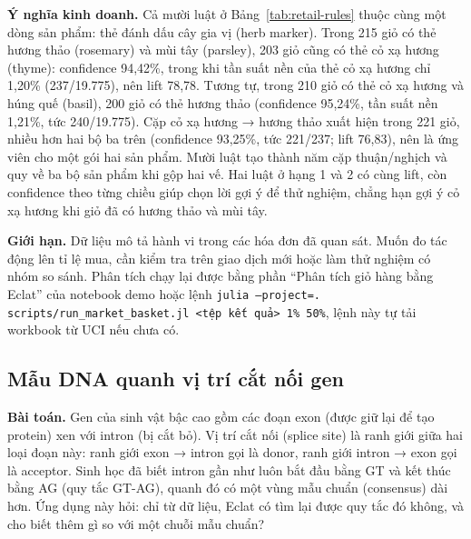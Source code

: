 \textbf{Ý nghĩa kinh doanh.} Cả mười luật ở Bảng~\ref{tab:retail-rules} thuộc cùng một dòng sản phẩm: thẻ đánh dấu
cây gia vị (herb marker). Trong 215 giỏ có thẻ hương thảo (rosemary) và mùi tây (parsley), 203 giỏ cũng có thẻ cỏ
xạ hương (thyme): confidence 94,42\%, trong khi tần suất nền của thẻ cỏ xạ hương chỉ 1,20\% (237/19.775), nên lift
78,78. Tương tự, trong 210 giỏ có thẻ cỏ xạ hương và húng quế (basil), 200 giỏ có thẻ hương thảo (confidence
95,24\%, tần suất nền 1,21\%, tức 240/19.775). Cặp cỏ xạ hương → hương thảo xuất hiện trong 221 giỏ, nhiều hơn hai
bộ ba trên (confidence 93,25\%, tức 221/237; lift 76,83), nên là ứng viên cho một gói hai sản phẩm. Mười luật tạo
thành năm cặp thuận/nghịch và quy về ba bộ sản phẩm khi gộp hai vế. Hai luật ở hạng 1 và 2 có cùng lift, còn
confidence theo từng chiều giúp chọn lời gợi ý để thử nghiệm, chẳng hạn gợi ý cỏ xạ hương khi giỏ đã có hương
thảo và mùi tây.

\textbf{Giới hạn.} Dữ liệu mô tả hành vi trong các hóa đơn đã quan sát. Muốn đo tác động lên tỉ lệ mua, cần kiểm
tra trên giao dịch mới hoặc làm thử nghiệm có nhóm so sánh. Phân tích chạy lại được bằng phần ``Phân tích giỏ hàng bằng
Eclat'' của notebook demo hoặc lệnh \texttt{julia --project=. scripts/run\_market\_basket.jl <tệp kết quả> 1\% 50\%}, lệnh này tự tải workbook
từ UCI nếu chưa có.

\subsection{Mẫu DNA quanh vị trí cắt nối gen}
\label{sec:app-splice}


\textbf{Bài toán.} Gen của sinh vật bậc cao gồm các đoạn exon (được giữ lại để tạo protein) xen với intron (bị
cắt bỏ). Vị trí cắt nối (splice site) là ranh giới giữa hai loại đoạn này: ranh giới exon → intron gọi là
donor, ranh giới intron → exon gọi là acceptor. Sinh học đã biết intron gần như luôn bắt đầu bằng GT và kết
thúc bằng AG (quy tắc GT-AG), quanh đó có một vùng mẫu chuẩn (consensus) dài hơn. Ứng dụng này hỏi: chỉ từ dữ
liệu, Eclat có tìm lại được quy tắc đó không, và cho biết thêm gì so với một chuỗi mẫu chuẩn?


